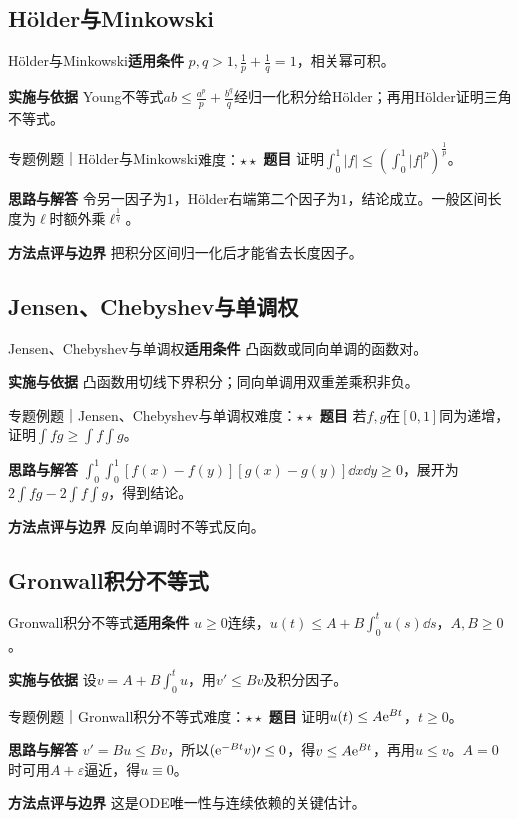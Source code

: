 \subsection{Hölder与Minkowski}\label{mat:integral_analysis:holder}
\begin{method}{Hölder与Minkowski}\textbf{适用条件} $p,q>1,\frac{1}{p}+\frac{1}{q}=1$，相关幂可积。\par\textbf{实施与依据} Young不等式$ab\le \frac{a^p}{p}+\frac{b^q}{q}$经归一化积分给Hölder；再用Hölder证明三角不等式。\end{method}
\begin{example}{专题例题｜Hölder与Minkowski}{难度：$\star\star$}
\textbf{题目} 证明$\int_0^1|f|\le(\int_0^1|f|^p)^{\frac{1}{p}}$。\par\textbf{思路与解答} 令另一因子为1，Hölder右端第二个因子为$1$，结论成立。一般区间长度为$\ell$时额外乘$\ell^{\frac{1}{q}}$。\par\textbf{方法点评与边界} 把积分区间归一化后才能省去长度因子。
\end{example}
\subsection{Jensen、Chebyshev与单调权}\label{mat:integral_analysis:jensen}
\begin{method}{Jensen、Chebyshev与单调权}\textbf{适用条件} 凸函数或同向单调的函数对。\par\textbf{实施与依据} 凸函数用切线下界积分；同向单调用双重差乘积非负。\end{method}
\begin{example}{专题例题｜Jensen、Chebyshev与单调权}{难度：$\star\star$}
\textbf{题目} 若$f,g$在$[0,1]$同为递增，证明$\int fg\ge\int f\int g$。\par\textbf{思路与解答} $\int_0^1\int_0^1[f(x)-f(y)][g(x)-g(y)]\dd x\dd y\ge0$，展开为$2\int fg-2\int f\int g$，得到结论。\par\textbf{方法点评与边界} 反向单调时不等式反向。
\end{example}
\subsection{Gronwall积分不等式}\label{mat:integral_analysis:gronwall}
\begin{method}{Gronwall积分不等式}\textbf{适用条件} $u\ge0$连续，$u(t)\le A+B\int_0^tu(s)\dd s$，$A,B\ge0$。\par\textbf{实施与依据} 设$v=A+B\int_0^tu$，用$v\prime\le Bv$及积分因子。\end{method}
\begin{example}{专题例题｜Gronwall积分不等式}{难度：$\star\star$}
\textbf{题目} 证明$u(t)\le A\mathrm{e}^{Bt}$，$t\ge0$。\par\textbf{思路与解答} $v\prime=Bu\le Bv$，所以$(\mathrm{e}^{-Bt}v)\prime\le0$，得$v\le A\mathrm{e}^{Bt}$，再用$u\le v$。$A=0$时可用$A+\varepsilon$逼近，得$u\equiv0$。\par\textbf{方法点评与边界} 这是ODE唯一性与连续依赖的关键估计。
\end{example}
